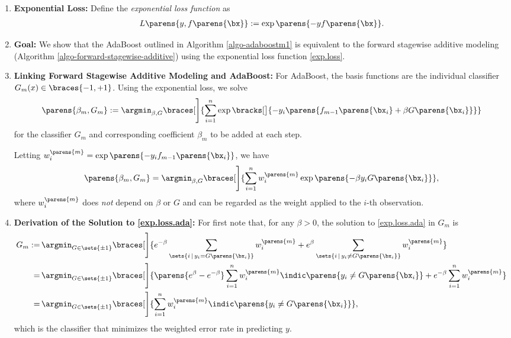 \documentclass[12pt]{article}
\begin{document}
\begin{enumerate}[label=\textbf{\arabic*.}]

	\item \textbf{Exponential Loss:} Define the \textit{exponential loss function} as 
	\begin{align}\label{exp.loss}
		L \parens{y, f \parens{\bx}} := \exp \parens{-y f \parens{\bx}}. 
	\end{align}
	
	\item \textbf{Goal:} We show that the AdaBoost outlined in Algorithm \ref{algo-adaboostm1} is equivalent to the forward stagewise additive modeling (Algorithm \ref{algo-forward-stagewise-additive}) using the exponential loss function \eqref{exp.loss}. 
	
	\item \textbf{Linking Forward Stagewise Additive Modeling and AdaBoost:} For AdaBoost, the basis functions are the individual classifier $G_m(x) \in \braces{-1, +1}$. Using the exponential loss, we solve
	\begin{align*}
		\parens{\beta_m, G_m} := \argmin_{\beta, G} \braces[\Bigg]{\sum_{i=1}^n \exp \bracks[\big]{-y_i \parens{f_{m-1} \parens{\bx_i} + \beta  G \parens{\bx_i}}}}
	\end{align*}
	for the classifier $G_m$ and corresponding coefficient $\beta_m$ to be added at each step. 
	
	Letting $w_i^{\parens{m}} = \exp \parens{-y_i f_{m-1} \parens{\bx_i}}$, we have 
	\begin{align}\label{exp.loss.ada}
		\parens{\beta_m, G_m} = \argmin_{\beta, G} \braces[\Bigg]{\sum_{i=1}^n w_i^{\parens{m}} \exp \parens{- \beta y_i G \parens{\bx_i}}}, 
	\end{align}
	where $w_i^{\parens{m}}$ does \emph{not} depend on $\beta$ or $G$ and can be regarded as the weight applied to the $i$-th observation. 
	
	\item \textbf{Derivation of the Solution to \eqref{exp.loss.ada}:} For first note that, for any $\beta > 0$, the solution to \eqref{exp.loss.ada} in $G_m$ is 
	\begin{align*}
			G_m := & \, \argmin_{G \in \sets{\pm 1}} \braces[\Bigg]{e^{-\beta} \sum_{ \sets{ i \,\vert\, y_i = G \parens{\bx_i}} } w_i^{\parens{m}} + e^{\beta} \sum_{ \sets{ i \,\vert\, y_i \ne G \parens{\bx_i} } } w_i^{\parens{m}}} \\ 
			= & \, \argmin_{G \in \sets{\pm 1}} \braces[\Bigg]{\parens{e^{\beta} - e^{-\beta}} \sum_{i = 1}^n w_i^{\parens{m}} \indic \parens{y_i \ne G \parens{\bx_i}} + e^{-\beta} \sum_{i = 1}^n w_i^{\parens{m}}} \\ 
			= & \, \argmin_{G \in \sets{\pm 1}} \braces[\Bigg]{\sum_{i=1}^n w_i^{\parens{m}} \indic \parens{y_i \ne G \parens{\bx_i}}}, 
	\end{align*}
	which is the classifier that minimizes the weighted error rate in predicting $y$. 
	

\end{enumerate}
\end{document}
